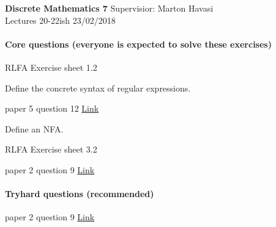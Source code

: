 \documentclass{exam}
\begin{document}
\noindent
\large\textbf{Discrete Mathematics 7} \hfill Supervisior: Marton Havasi \\
\normalsize Lectures 20-22ish \hfill 23/02/2018

\paragraph{Core questions (everyone is expected to solve these exercises)}
\begin{questions}

\question RLFA Exercise sheet 1.2

\question Define the concrete syntax of regular expressions.

 paper 5 question 12 \href{http://www.cl.cam.ac.uk/teaching/exams/pastpapers/y1993p5q12.pdf}{Link}

\question Define an NFA.

\question RLFA Exercise sheet 3.2

 paper 2 question 9 \href{http://www.cl.cam.ac.uk/teaching/exams/pastpapers/y2009p2q9.pdf}{Link}

\end{questions}

\paragraph{Tryhard questions (recommended)}
\begin{questions}

 paper 2 question 9 \href{http://www.cl.cam.ac.uk/teaching/exams/pastpapers/y2003p2q9.pdf}{Link}


\end{questions}
\end{document}
